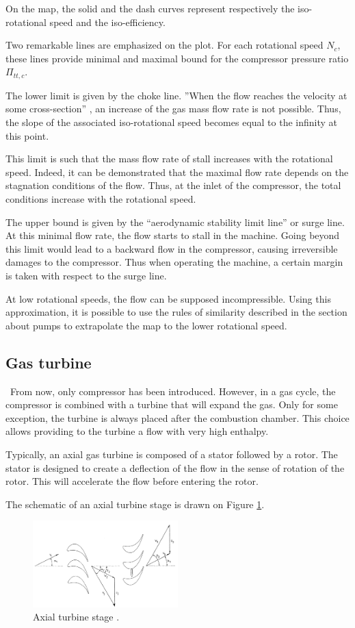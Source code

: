 On the map, the solid and the dash curves represent respectively the iso-rotational speed and the iso-efficiency.

Two remarkable lines are emphasized on the plot. For each rotational speed \(N_c\), these lines provide minimal and maximal bound for the compressor pressure ratio \(\Pi_{tt,c}\).

The lower limit is given by the choke line. ''When the flow reaches the velocity at some cross-section'' \cite{Ghorbanian2009}, an increase of the gas mass flow rate is not possible. Thus, the slope of the associated iso-rotational speed becomes equal to the infinity at this point. 

This limit is such that the mass flow rate of stall increases with the rotational speed. Indeed, it can be demonstrated that the maximal flow rate depends on the stagnation conditions of the flow. Thus, at the inlet of the compressor, the total conditions increase with the rotational speed. 

The upper bound is given by the “aerodynamic stability limit line'' or surge line. At this minimal flow rate, the flow starts to stall in the machine. Going beyond this limit would lead to a backward flow in the compressor, causing irreversible damages to the compressor. Thus when operating the machine, a certain margin is taken with respect to the surge line.

At low rotational speeds, the flow can be supposed incompressible. Using this approximation, it is possible to use the rules of similarity described in the section about pumps to extrapolate the map to the lower rotational speed.

\subsection{Gas turbine}
\quad\ From now, only compressor has been introduced. However, in a gas cycle, the compressor is combined with a turbine that will expand the gas. Only for some exception, the turbine is always placed after the combustion chamber. This choice allows providing to the turbine a flow with very high enthalpy.

Typically, an axial gas turbine is composed of a stator followed by a rotor. The stator is designed to create a deflection of the flow in the sense of rotation of the rotor. This will accelerate the flow before entering the rotor.

The schematic of an axial turbine stage is drawn on Figure \ref{fig:C4_turbstage}.
\begin{figure}[h]
    \centering
    \includegraphics[width=0.5\textwidth]{Turb_stage.png}
    \caption{Axial turbine stage \cite{Hillewaert2019}.}
    \label{fig:C4_turbstage}
\end{figure}
